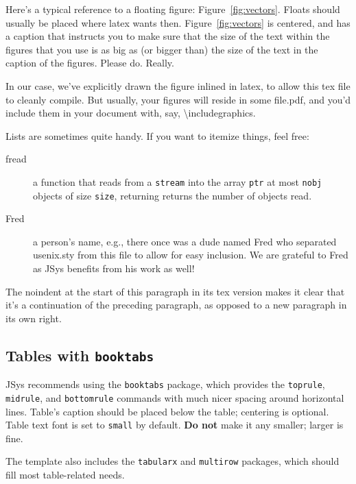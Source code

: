 Here's a typical reference to a floating figure: Figure~\ref{fig:vectors}.
Floats should usually be placed where latex wants then. Figure~\ref{fig:vectors}
is centered, and has a caption that instructs you to make sure that the size of
the text within the figures that you use is as big as (or bigger than) the size
of the text in the caption of the figures. Please do. Really.

In our case, we've explicitly drawn the figure inlined in latex, to allow this
tex file to cleanly compile. But usually, your figures will reside in some
file.pdf, and you'd include them in your document with, say,
\textbackslash{}includegraphics.

Lists are sometimes quite handy. If you want to itemize things, feel free:

\begin{description}
  
\item[fread] a function that reads from a \texttt{stream} into the array
  \texttt{ptr} at most \texttt{nobj} objects of size \texttt{size}, returning
  returns the number of objects read.

\item[Fred] a person's name, e.g., there once was a dude named Fred who
  separated usenix.sty from this file to allow for easy inclusion. We are
  grateful to Fred as JSys benefits from his work as well! 
\end{description}

\noindent
The noindent at the start of this paragraph in its tex version makes it clear
that it's a continuation of the preceding paragraph, as opposed to a new
paragraph in its own right.

\subsection{Tables with \texttt{booktabs}}

JSys recommends using the \texttt{booktabs} package, which provides the \texttt{toprule}, \texttt{midrule}, and \texttt{bottomrule} commands with much nicer spacing around horizontal lines. Table's caption should be placed {below} the table; centering is optional. Table text font is set to \texttt{small} by default. \textbf{Do not} make it any smaller; larger is fine.

The template also includes the \texttt{tabularx} and \texttt{multirow} packages, which should fill most table-related needs.

